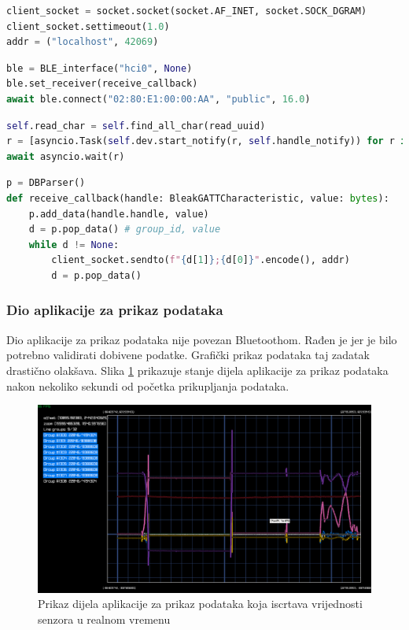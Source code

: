 \documentclass[times, utf8, diplomski]{diplomski}
\begin{document}
\begin{lstlisting}[language=python, caption={Kreiranje UDP socketa u Pythonu}, label={pyudpsock}]
client_socket = socket.socket(socket.AF_INET, socket.SOCK_DGRAM)
client_socket.settimeout(1.0)
addr = ("localhost", 42069)
\end{lstlisting}

\begin{lstlisting}[language=python, caption={Spajanje Bluetoothom na mikrokontroler}, label={pyconnect}]
ble = BLE_interface("hci0", None)
ble.set_receiver(receive_callback)
await ble.connect("02:80:E1:00:00:AA", "public", 16.0)
\end{lstlisting}

\begin{lstlisting}[language=python, caption={Pretplaćivanje na sve obavijesti sa svih servisa i karakterističnih tokova na mikrokontroleru}, label={pysubscribe}]
self.read_char = self.find_all_char(read_uuid)
r = [asyncio.Task(self.dev.start_notify(r, self.handle_notify)) for r in self.read_char]
await asyncio.wait(r)
\end{lstlisting}

\begin{lstlisting}[language=python, caption={Prosljeđivanje dobivene Bluetooth vrijednosti drugom dijelu aplikacije}, label={relay}]
p = DBParser()
def receive_callback(handle: BleakGATTCharacteristic, value: bytes):
    p.add_data(handle.handle, value)
    d = p.pop_data() # group_id, value 
    while d != None:
        client_socket.sendto(f"{d[1]};{d[0]}".encode(), addr)
        d = p.pop_data()
\end{lstlisting}

\subsubsection{Dio aplikacije za prikaz podataka}
Dio aplikacije za prikaz podataka nije povezan Bluetoothom. Rađen je jer je bilo potrebno validirati dobivene podatke. Grafički prikaz podataka taj zadatak drastično olakšava. Slika \ref{fig:graph} prikazuje stanje dijela aplikacije za prikaz podataka nakon nekoliko sekundi od početka prikupljanja podataka. 

\begin{figure}[H]
\includegraphics[width=\textwidth]{rlplot_allsensors_20230623_120537.png}
\centering
\caption{Prikaz dijela aplikacije za prikaz podataka koja iscrtava vrijednosti senzora u realnom vremenu}
\label{fig:graph}
\end{figure}
\end{document}
